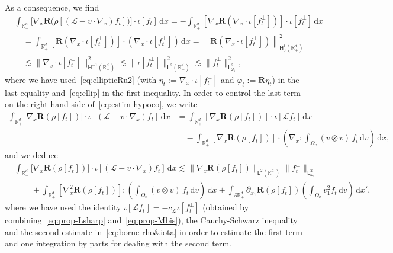 \documentclass[11pt]{amsart}
\theoremstyle{definition}
\theoremstyle{remark}
\numberwithin{equation}{section}
\newcommand\R{{\mathbb R}}
\def\LL{{\mathcal L}}
\newcommand{\dd}{{\, \mathrm d}}
\newcommand{\sfL}{\mathsf{L}}
\newcommand{\sfH}{\mathsf{H}}
\begin{document}
As a consequence, we find
\begin{align*}
  & \int_{\R_+^d} \Big[ \nabla_x \mathbf R \Big( \rho[(\mathcal L-v \cdot \nabla_x)f_t] \Big) \Big] \cdot \iota[f_t] \dd x
    = - \int_{\R_+^d} \left[ \nabla_x \mathbf R \left( \nabla_x \cdot \iota [f^\bot_t] \right) \right] \cdot \iota[f^\bot_t] \dd x \\
  & \quad = \int_{\R_+^d} \left[ \mathbf R \left( \nabla_x \cdot \iota [f^\bot_t] \right)\right] \cdot \left( \nabla_x \cdot \iota[f^\bot_t] \right) \dd x = \left\| \mathbf R \left( \nabla_x \cdot \iota [f^\bot_t] \right) \right\|^2 _{\sfH^{1}_{0}(\R^d_+)} \\
  & \quad \lesssim \big\| \nabla_x \cdot \iota[f^\bot_t] \big\|_{\sfH^{-1}(\R_+^d)} ^2 \lesssim \big\| \iota[f^\bot_t] \big\|_{\sfL^{2}(\R_+^d)} ^2 \lesssim \big\| f^\bot _t\big\|_{\sfL^2_{\omega_1}}^2,
\end{align*}
where we have used~\eqref{eq:ellipticRu2} (with $\eta_t := \nabla_x \cdot \iota [f^\bot_t]$ and $\varphi_t :=  \mathbf R \eta_t$) in the last equality and~\eqref{eq:ellip}  in the first inequality.
In order to control the last term on the right-hand side of~\eqref{eq:estim-hypoco}, we write
\begin{align*}
  \int_{\R_+^d} \big[ \nabla_x \mathbf R \left( \rho[f_t]\right) \big] \cdot \iota[(\mathcal L-v \cdot \nabla_x)f_t] \dd x
  & = \int_{\R_+^d} \left[ \nabla_x \mathbf R \left( \rho[f_t] \right) \right] \cdot \iota[\mathcal L f_t] \dd x \\
  &\quad - \int_{\R_+^d} \left[ \nabla_x \mathbf R \left( \rho[f_t]\right) \right] \cdot \left( \nabla_x : \int_{\Omega_v} (v \otimes v) \, f_t \dd v \right) \dd x,
\end{align*}
and we deduce
\begin{align}
  \nonumber
  & \int_{\R_+^d} \big[ \nabla_x \mathbf R \left( \rho[f_t]\right) \big] \cdot \iota[(\mathcal L-v \cdot \nabla_x)f_t] \dd x
    \lesssim \big\| \nabla_x \mathbf R \left( \rho[f_t] \right) \big\|_{\sfL^{2}(\R_+^d)} \| f^\bot_t \|_{\sfL^2_{\omega_1}} \\
  \label{eq:estim-hypo-inter}
  & \qquad + \int_{\R_+^d} \left[ \nabla^2 _x \mathbf R \left( \rho[f_t] \right) \right] : \left( \int_{\Omega_v} (v \otimes v) \, f_t \dd v \right) \dd x + \int_{\partial \R_+^d} \partial_{x_1} \mathbf R \left( \rho[f_t] \right) \left( \int_{\Omega_v} v_1^2 f_t \dd v \right) \dd x',
\end{align}
where we have used  the identity $\iota [ \mathcal L f_t] = - c_\LL \iota[f^\bot_t]$ (obtained by combining~\eqref{eq:prop-Lsharp} and~\eqref{eq:prop-Mbis}), the Cauchy-Schwarz inequality and the second estimate in~\eqref{eq:borne-rho&iota} in order to estimate the first term and one integration by parts for dealing with the second term.
\end{document}
